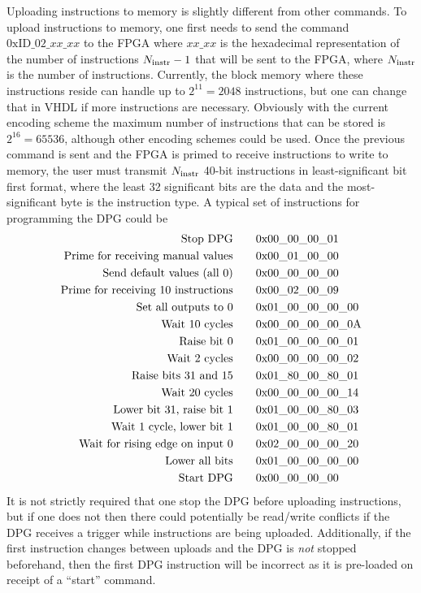 \documentclass[]{article}
\begin{document}
Uploading instructions to memory is slightly different from other commands.  To upload instructions to memory, one first needs to send the command $0\mathrm{xID}\_02\_xx\_xx$ to the FPGA where $xx\_xx$ is the hexadecimal representation of the number of instructions $N_{\rm instr}-1$ that will be sent to the FPGA, where $N_{\rm instr}$ is the number of instructions.  Currently, the block memory where these instructions reside can handle up to $2^11=2048$ instructions, but one can change that in VHDL if more instructions are necessary.  Obviously with the current encoding scheme the maximum number of instructions that can be stored is $2^16=65536$, although other encoding schemes could be used.  Once the previous command is sent and the FPGA is primed to receive instructions to write to memory, the user must transmit $N_{\rm instr}$ 40-bit instructions in least-significant bit first format, where the least 32 significant bits are the data and the most-significant byte is the instruction type.  A typical set of instructions for programming the DPG could be
\begin{align}
\textrm{Stop DPG}\quad\quad&0\mathrm{x}00\_00\_00\_01\notag\\
\textrm{Prime for receiving manual values}\quad\quad&0\mathrm{x}00\_01\_00\_00\notag\\
\textrm{Send default values (all 0)}\quad\quad&0\mathrm{x}00\_00\_00\_00\notag\\
\textrm{Prime for receiving 10 instructions}\quad\quad&0\mathrm{x}00\_02\_00\_09\notag\\
\textrm{Set all outputs to 0}\quad\quad&0\mathrm{x}01\_00\_00\_00\_00\notag\\
\textrm{Wait 10 cycles}\quad\quad&0\mathrm{x}00\_00\_00\_00\_0\mathrm{A}\notag\\
\textrm{Raise bit 0}\quad\quad&0\mathrm{x}01\_00\_00\_00\_01\notag\\
\textrm{Wait 2 cycles}\quad\quad&0\mathrm{x}00\_00\_00\_00\_02\notag\\
\textrm{Raise bits 31 and 15}\quad\quad&0\mathrm{x}01\_80\_00\_80\_01\notag\\
\textrm{Wait 20 cycles}\quad\quad&0\mathrm{x}00\_00\_00\_00\_14\notag\\
\textrm{Lower bit 31, raise bit 1}\quad\quad&0\mathrm{x}01\_00\_00\_80\_03\notag\\
\textrm{Wait 1 cycle, lower bit 1}\quad\quad&0\mathrm{x}01\_00\_00\_80\_01\notag\\
\textrm{Wait for rising edge on input 0}\quad\quad&0\mathrm{x}02\_00\_00\_00\_20\notag\\
\textrm{Lower all bits}\quad\quad&0\mathrm{x}01\_00\_00\_00\_00\notag\\
\textrm{Start DPG}\quad\quad&0\mathrm{x}00\_00\_00\_00\notag
\end{align}
It is not strictly required that one stop the DPG before uploading instructions, but if one does not then there could potentially be read/write conflicts if the DPG receives a trigger while instructions are being uploaded.  Additionally, if the first instruction changes between uploads and the DPG is \emph{not} stopped beforehand, then the first DPG instruction will be incorrect as it is pre-loaded on receipt of a ``start'' command.
\end{document}
